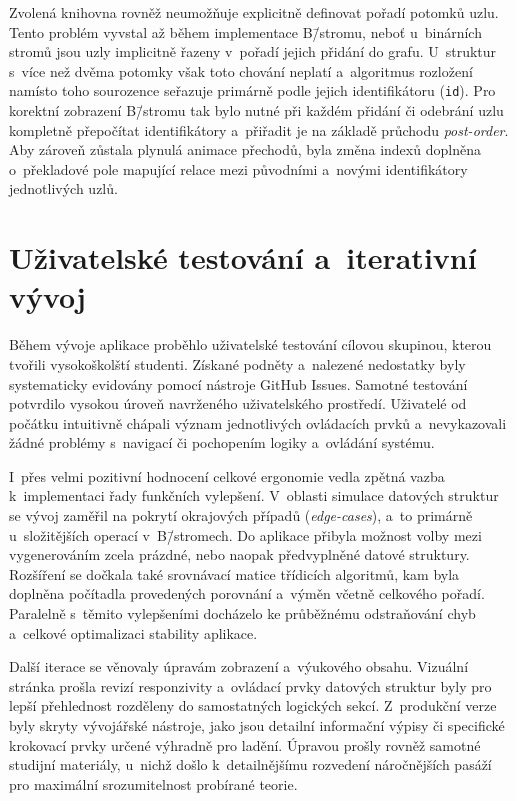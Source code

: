Zvolená knihovna rovněž neumožňuje explicitně definovat pořadí potomků uzlu.
Tento problém vyvstal až během implementace B\=/stromu, neboť u~binárních stromů jsou uzly implicitně řazeny v~pořadí jejich přidání do grafu.
U~struktur s~více než dvěma potomky však toto chování neplatí a~algoritmus rozložení namísto toho sourozence seřazuje primárně podle jejich identifikátoru (\texttt{id}).
Pro korektní zobrazení B\=/stromu tak bylo nutné při každém přidání či odebrání uzlu kompletně přepočítat identifikátory a~přiřadit je na základě průchodu \textit{post-order}.
Aby zároveň zůstala plynulá animace přechodů, byla změna indexů doplněna o~překladové pole mapující relace mezi původními a~novými identifikátory jednotlivých uzlů.

\section{Uživatelské testování a~iterativní vývoj}
\label{sec:testing_and_iteration}

Během vývoje aplikace proběhlo uživatelské testování cílovou skupinou, kterou tvořili vysokoškolští studenti.
Získané podněty a~nalezené nedostatky byly systematicky evidovány pomocí nástroje \mbox{GitHub} Issues.
Samotné testování potvrdilo vysokou úroveň navrženého uživatelského prostředí.
Uživatelé od počátku intuitivně chápali význam jednotlivých ovládacích prvků a~nevykazovali žádné problémy s~navigací či pochopením logiky a~ovládání systému.

I~přes velmi pozitivní hodnocení celkové ergonomie vedla zpětná vazba k~implementaci řady funkčních vylepšení.
V~oblasti simulace datových struktur se vývoj zaměřil na pokrytí okrajových případů (\textit{edge-cases}), a~to primárně u~složitějších operací v~B\=/stromech.
Do aplikace přibyla možnost volby mezi vygenerováním zcela prázdné, nebo naopak předvyplněné datové struktury.
Rozšíření se dočkala také srovnávací matice třídicích algoritmů, kam byla doplněna počítadla provedených porovnání a~výměn včetně celkového pořadí.
Paralelně s~těmito vylepšeními docházelo ke průběžnému odstraňování chyb a~celkové optimalizaci stability aplikace.

Další iterace se věnovaly úpravám zobrazení a~výukového obsahu.
Vizuální stránka prošla revizí responzivity a~ovládací prvky datových struktur byly pro lepší přehlednost rozděleny do samostatných logických sekcí.
Z~produkční verze byly skryty vývojářské nástroje, jako jsou detailní informační výpisy či specifické krokovací prvky určené výhradně pro ladění.
Úpravou prošly rovněž samotné studijní materiály, u~nichž došlo k~detailnějšímu rozvedení náročnějších pasáží pro maximální srozumitelnost probírané teorie.

